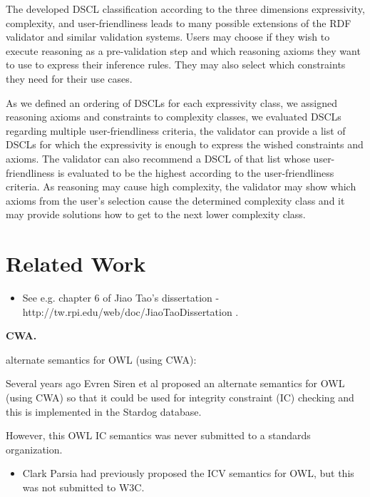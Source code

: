 \documentclass{llncs}
\begin{document}
The developed DSCL classification according to the three dimensions expressivity, complexity, and user-friendliness leads to many possible extensions of the RDF validator and similar validation systems.
Users may choose if they wish to execute reasoning as a pre-validation step and which reasoning axioms they want to use to express their inference rules.
They may also select which constraints they need for their use cases.

As we defined an ordering of DSCLs for each expressivity class, we assigned reasoning axioms and constraints to complexity classes, we evaluated DSCLs regarding multiple user-friendliness criteria, the validator can provide a list of DSCLs for which the expressivity is enough to express the wished constraints and axioms.
The validator can also recommend a DSCL of that list whose user-friendliness is evaluated to be the highest according to the user-friendliness criteria.
As reasoning may cause high complexity, the validator may show which axioms from the user's selection cause the determined complexity class 
and it may provide solutions how to get to the next lower complexity class.

\section{Related Work}

\begin{itemize}
	\item See e.g. chapter 6 of Jiao Tao's dissertation - http://tw.rpi.edu/web/doc/JiaoTaoDissertation .
\end{itemize}

\textbf{CWA.}

alternate semantics for OWL (using CWA):

Several years ago Evren Siren et al proposed an alternate semantics for OWL (using CWA) so that it could be used for integrity constraint (IC) checking and this is implemented in the Stardog database. 

However, this OWL IC semantics was never submitted to a standards organization.

\begin{itemize}
	\item Clark Parsia had previously proposed the ICV semantics for OWL, but this was not submitted to W3C.
\end{itemize}
\end{document}
